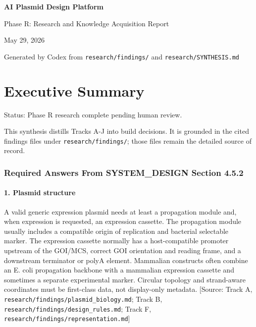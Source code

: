 \documentclass[11pt]{report}
\begin{document}
\begin{titlepage}
\centering
\vspace*{1.5in}
{\Huge\bfseries AI Plasmid Design Platform\par}
\vspace{0.35in}
{\LARGE Phase R: Research and Knowledge Acquisition Report\par}
\vspace{0.35in}
{\large May 29, 2026\par}
\vfill
{\large Generated by Codex from \texttt{research/findings/} and \texttt{research/SYNTHESIS.md}\par}
\end{titlepage}
\tableofcontents
\clearpage

\chapter{Executive Summary}

Status: Phase R research complete pending human review.\par

This synthesis distills Tracks A-J into build decisions. It is grounded in the cited findings files under \texttt{research/findings/}; those files remain the detailed source of record.\par

\subsection{Required Answers From SYSTEM\_DESIGN Section 4.5.2}

\subsubsection{1. Plasmid structure}

A valid generic expression plasmid needs at least a propagation module and, when expression is requested, an expression cassette. The propagation module usually includes a compatible origin of replication and bacterial selectable marker. The expression cassette normally has a host-compatible promoter upstream of the GOI/MCS, correct GOI orientation and reading frame, and a downstream terminator or polyA element. Mammalian constructs often combine an E. coli propagation backbone with a mammalian expression cassette and sometimes a separate experimental marker. Circular topology and strand-aware coordinates must be first-class data, not display-only metadata. [Source: Track A, \texttt{research/findings/plasmid\_biology.md}; Track B, \texttt{research/findings/design\_rules.md}; Track F, \texttt{research/findings/representation.md}]\par
\end{document}
